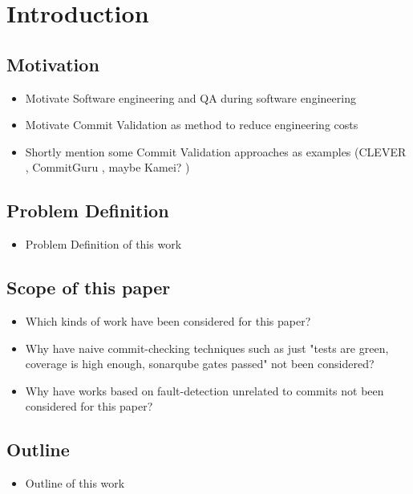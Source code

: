 \section{Introduction}

\subsection{Motivation}
\begin{itemize}
	\item Motivate Software engineering and QA during software engineering
	\item Motivate Commit Validation as method to reduce engineering costs
	\item Shortly mention some Commit Validation approaches as examples (CLEVER \cite{Nayrolles2018}, CommitGuru \cite{Rosen2015}, maybe Kamei? \cite{Kamei2013})
\end{itemize}

\subsection{Problem Definition}
\begin{itemize}
	\item Problem Definition of this work
\end{itemize}

\subsection{Scope of this paper}
\label{sec:scope}
\begin{itemize}
	\item Which kinds of work have been considered for this paper?
	\item Why have naive commit-checking techniques such as just "tests are green, coverage is high enough, sonarqube gates passed" not been considered?
	\item Why have works based on fault-detection unrelated to commits not been considered for this paper?
\end{itemize}

\subsection{Outline}
\begin{itemize}
	\item Outline of this work
\end{itemize}


